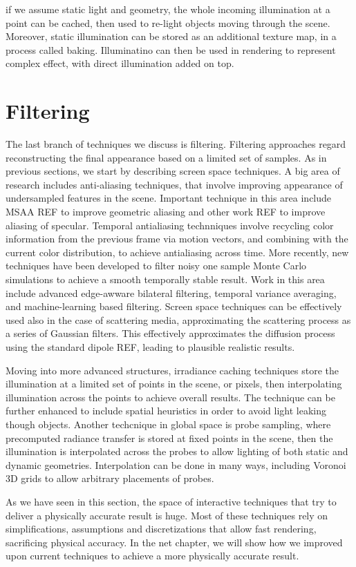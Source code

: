 if we assume static light and geometry, the whole incoming illumination at a point can be cached, then used to re-light objects moving through the scene. Moreover, static illumination can be stored as an additional texture map, in a process called baking. Illuminatino can then be used in rendering to represent complex effect, with direct illumination added on top. 

\section{Filtering}

The last branch of techniques we discuss is filtering. Filtering approaches regard reconstructing the final appearance based on a limited set of samples. As in previous sections, we start by describing screen space techniques. A big area of research includes anti-aliasing techniques, that involve improving appearance of undersampled features in the scene. Important technique in this area include MSAA REF to improve geometric aliasing and other work REF to improve aliasing of specular. Temporal antialiasing technniques involve recycling color information from the previous frame via motion vectors, and combining with the current color distribution, to achieve antialiasing across time. More recently, new techniques have been developed to filter noisy one sample Monte Carlo simulations to achieve a smooth temporally stable result. Work in this area include advanced edge-awware bilateral filtering, temporal variance averaging, and machine-learning based filtering. Screen space techniques can be effectively used also in the case of scattering media, approximating the scattering process as a series of Gaussian filters. This effectively approximates the diffusion process using the standard dipole REF, leading to plausible realistic results. 

Moving into more advanced structures, irradiance caching techniques store the illumination at a limited set of points in the scene, or pixels, then interpolating illumination across the points to achieve overall results. The technique can be further enhanced to include spatial heuristics in order to avoid light leaking though objects. Another techcnique in global space is probe sampling, where precomputed radiance transfer is stored at fixed points in the scene, then the illumination is interpolated across the probes to allow lighting of both static and dynamic geometries. Interpolation can be done in many ways, including Voronoi 3D grids to allow arbitrary placements of probes.


As we have seen in this section, the space of interactive techniques that try to deliver a physically accurate result is huge. Most of these techniques rely on simplifications, assumptions and discretizations that allow fast rendering, sacrificing physical accuracy. In the net chapter, we will show how we improved upon current techniques to achieve a more physically accurate result.

